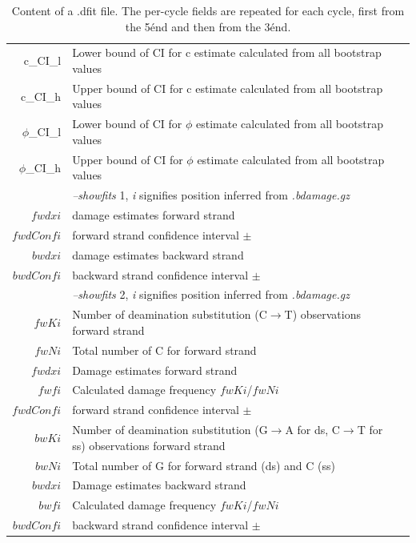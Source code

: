 \documentclass[10pt]{article}
\begin{document}
\begin{table}[h]
\begin{tabular}{rll}
  {\sf c\_CI\_l} & Lower bound of CI for c estimate calculated from all bootstrap values \\
  {\sf c\_CI\_h} & Upper bound of CI for c estimate calculated from all bootstrap values \\
  {\sf $\phi$\_CI\_l} & Lower bound of CI for $\phi$ estimate calculated from all bootstrap values \\
  {\sf $\phi$\_CI\_h} & Upper bound of CI for $\phi$ estimate calculated from all bootstrap values \\ \hline
  {\sf } & \textit{--showfits} 1, \textit{i} signifies position inferred from \textit{.bdamage.gz}\\ \hline  
  {\sf $fwdxi$} & damage estimates forward strand \\
  {\sf $fwdConfi$} & forward strand confidence interval $\pm$\\
  {\sf $bwdxi$} & damage estimates backward strand\\
  {\sf $bwdConfi$} & backward strand confidence interval $\pm$\\ \hline
  {\sf } & \textit{--showfits} 2, \textit{i} signifies position inferred from \textit{.bdamage.gz} \\ \hline  
  {\sf $fwKi$} & Number of deamination substitution (C$\rightarrow$T) observations forward strand \\
  {\sf $fwNi$} & Total number of  C for forward strand\\
  {\sf $fwdxi$} & Damage estimates forward strand \\
  {\sf $fwfi$} & Calculated damage frequency $fwKi$/$fwNi$\\
  {\sf $fwdConfi$} & forward strand confidence interval $\pm$\\
  {\sf $bwKi$} & Number of deamination substitution (G$\rightarrow$A for ds, C$\rightarrow$T for ss) observations forward strand \\
  {\sf $bwNi$} & Total number of G for forward strand (ds) and C (ss)\\
  {\sf $bwdxi$} & Damage estimates backward strand \\
  {\sf $bwfi$} & Calculated damage frequency $fwKi$/$fwNi$\\
  {\sf $bwdConfi$} & backward strand confidence interval $\pm$\\ \hline
\end{tabular}\label{tab4}
\caption{Content of a .dfit file. The per-cycle fields are repeated
  for each cycle, first from the 5\' end and then from the 3\' end.} 
\end{table}
\end{document}

